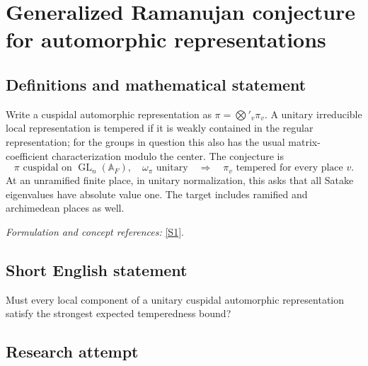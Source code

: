 \documentclass[11pt,a4paper]{article}
\newcommand{\A}{\mathbb{A}}
\newcommand{\sref}[2]{\hyperlink{source:#1:#2}{[S#2]}}
\newif\ifshowcatalogue
\newcommand{\cataloguescope}[1]{\ifshowcatalogue
 \paragraph{Exact scope in the supplied catalogue.}
 \begin{quote}\small #1\end{quote}\fi}
\numberwithin{equation}{section}
\begin{document}
\setcounter{section}{0}
\clearpage
\section*{\texorpdfstring{Generalized Ramanujan conjecture for automorphic representations}{Generalized Ramanujan conjecture for automorphic representations}}\label{9400078}
\subsection{Definitions and mathematical statement}
Write a cuspidal automorphic representation as $\pi=\bigotimes'_v\pi_v$. A unitary irreducible local representation is tempered if it is weakly contained in the regular representation; for the groups in question this also has the usual matrix-coefficient characterization modulo the center. The conjecture is
\[
 \pi\text{ cuspidal on }\operatorname{GL}_n(\A_F),\quad
 \omega_\pi\text{ unitary}\quad\Longrightarrow\quad
 \pi_v\text{ tempered for every place }v.
\]
At an unramified finite place, in unitary normalization, this asks that all Satake eigenvalues have absolute value one. The target includes ramified and archimedean places as well.
\par\smallskip\textit{Formulation and concept references:} \sref{9400078}{1}.
\cataloguescope{Prove that for every number field F and every cuspidal automorphic representation pi of GL\_n(A\_F) with unitary central character, each local component pi\_v is tempered at every place v.}
\subsection{Short English statement}
Must every local component of a unitary cuspidal automorphic representation satisfy the strongest expected temperedness bound?
\subsection{Research attempt}
\end{document}
